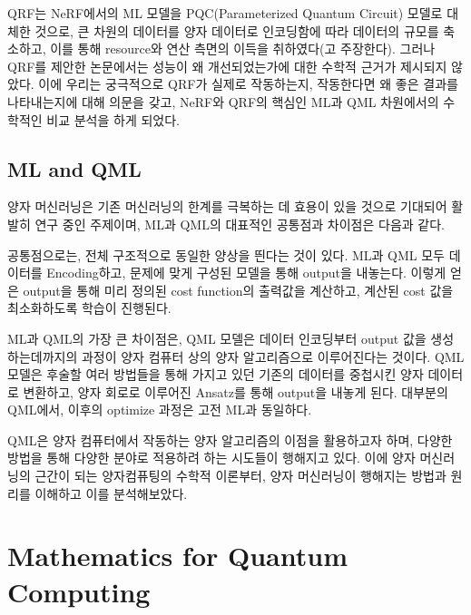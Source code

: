 QRF는 NeRF에서의 ML 모델을 PQC(Parameterized Quantum Circuit) 모델로 대체한 것으로, 큰 차원의 데이터를 양자 데이터로 인코딩함에 따라 데이터의 규모를 축소하고, 이를 통해 resource와 연산 측면의 이득을 취하였다(고 주장한다). 그러나 QRF를 제안한 논문에서는 성능이 왜 개선되었는가에 대한 수학적 근거가 제시되지 않았다. 이에 우리는 궁극적으로 QRF가 실제로 작동하는지, 작동한다면 왜 좋은 결과를 나타내는지에 대해 의문을 갖고, NeRF와 QRF의 핵심인 ML과 QML 차원에서의 수학적인 비교 분석을 하게 되었다.


\subsection{ML and QML}\label{ss:ml and qml}

양자 머신러닝은 기존 머신러닝의 한계를 극복하는 데 효용이 있을 것으로 기대되어 활발히 연구 중인 주제이며, ML과 QML의 대표적인 공통점과 차이점은 다음과 같다.

공통점으로는, 전체 구조적으로 동일한 양상을 띈다는 것이 있다. ML과 QML 모두 데이터를 Encoding하고, 문제에 맞게 구성된 모델을 통해 output을 내놓는다. 이렇게 얻은 output을 통해 미리 정의된 cost function의 출력값을 계산하고, 계산된 cost 값을 최소화하도록 학습이 진행된다.

ML과 QML의 가장 큰 차이점은, QML 모델은 데이터 인코딩부터 output 값을 생성하는데까지의 과정이 양자 컴퓨터 상의 양자 알고리즘으로 이루어진다는 것이다. QML 모델은 후술할 여러 방법들을 통해 가지고 있던 기존의 데이터를 중첩시킨 양자 데이터로 변환하고, 양자 회로로 이루어진 Ansatz를 통해 output을 내놓게 된다. 대부분의 QML에서, 이후의 optimize 과정은 고전 ML과 동일하다.

QML은 양자 컴퓨터에서 작동하는 양자 알고리즘의 이점을 활용하고자 하며, 다양한 방법을 통해 다양한 분야로 적용하려 하는 시도들이 행해지고 있다. 이에 양자 머신러닝의 근간이 되는 양자컴퓨팅의 수학적 이론부터, 양자 머신러닝이 행해지는 방법과 원리를 이해하고 이를 분석해보았다.

\section{Mathematics for Quantum Computing}\label{ss:math for qc}


